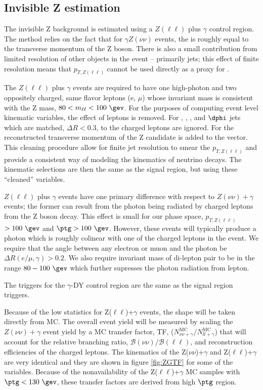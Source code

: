 \subsection{Invisible Z estimation}
\label{subsec:zinv}
The invisible Z background is estimated using a $Z(\ell\ell)$ plus $\gamma$ control region.
The method relies on the fact that for $\gamma Z(\nu\nu)$ events, the \ptmiss is
roughly equal to the transverse momentum of the Z boson.  There is also a small
contribution from limited resolution
of other objects in the event -- primarily jets; this effect of finite resolution
means that $p_{T,Z(\ell\ell)}$ cannot be used directly as a proxy for \ptmiss.   

The $Z(\ell\ell)$ plus $\gamma$ events are required to have one high-\pt photon and two oppositely 
charged, same flavor leptons (e, $\mu$) whose invariant mass is consistent with 
the Z mass, $80<m_{\ell\ell}<100~\gev$.  For the purposes of computing event level
kinematic variables, the effect of leptons is removed.  For \ST, \nj, \nb, and $\dphi$
jets which are matched, $\Delta R<0.3$, to the charged leptons are ignored.  For \ptmiss
the reconstructed transverse momentum of the Z candidate is added to the \ptmiss vector.
This cleaning procedure allow for finite jet resolution to smear the $p_{T,Z(\ell\ell)}$
and provide a consistent way of modeling the kinematics of neutrino decays.  The kinematic 
selections are then the same as the signal region, but using these ``cleaned'' variables.  

$Z(\ell\ell)$ plus $\gamma$ events have one primary difference with respect to $Z(\nu\nu)+\gamma$
events;  the former can result from the photon being radiated by charged leptons from the
Z boson decay.  This effect is small for our phase space, $p_{T,Z(\ell\ell)}$~\ptmiss$>100~\gev$ and 
$\ptg>100~\gev$.  However, these events will typically produce a photon which is
roughly colinear with one of the charged leptons in the event.  We require that the angle 
between any electron or muon and the photon be $\Delta R(e/\mu,\gamma)>0.2$. We also 
require invariant mass of di-lepton pair to be in the range $80-100\ \gev$ which further supresses 
the photon radiation from lepton.

The triggers for the $\gamma$-DY control region are the same as the signal region
triggers.

Because of the low statistics for Z($\ell\ell$)+$\gamma$ events, the \ptmiss shape will be taken directly from MC.  
The overall event yield will be measured by scaling the $Z(\nu\nu)+\gamma$ event yield
by a MC transfer factor, TF, ($N^{\text{MC}}_{\nu\nu+\gamma}/N_{ll+\gamma}^{\text{MC}}$) that will account for the relative branching ratio, $\mathcal{B}(\nu\nu)/\mathcal{B}(\ell\ell)$,
and reconstruction efficiencies of the charged leptons. The kinematics of the Z($\nu\nu$)+$\gamma$ and Z($\ell\ell$)+$\gamma$ are very identical
and they are shown in figure \ref{fig:ZGTF} for some of the variables. 
Because of the nonavailability of the Z($\ell\ell$)+$\gamma$ MC 
samples with $\ptg<130~\gev$, these transfer factors are derived from high $\ptg$ region.

